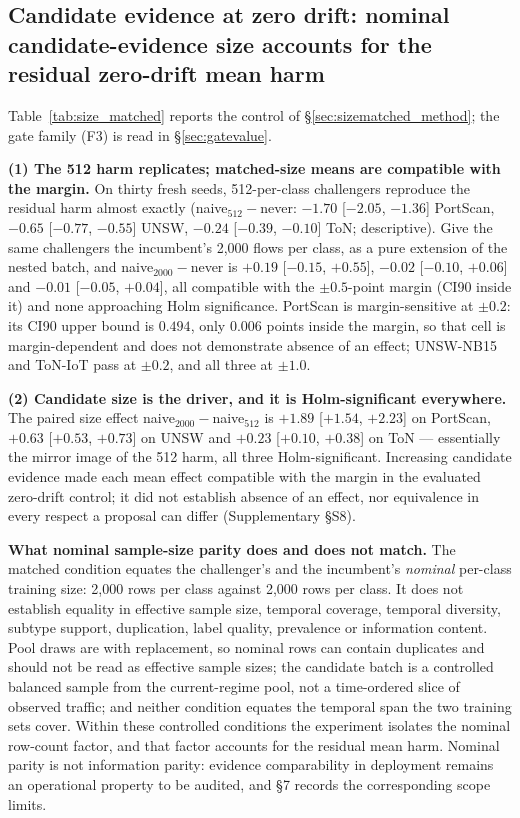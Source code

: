 \documentclass[journal]{IEEEtran}
\begin{document}
\subsection{Candidate evidence at zero drift: nominal candidate-evidence size accounts for the residual zero-drift mean harm}
\label{sec:sizematched}

Table~\ref{tab:size_matched} reports the control of \S\ref{sec:sizematched_method}; the gate family (F3) is read in \S\ref{sec:gatevalue}.

\textbf{(1) The 512 harm replicates; matched-size means are compatible with the margin.} On thirty fresh seeds, 512-per-class challengers reproduce the residual harm almost exactly (naive$_{512}-$never: $-1.70$ [$-2.05$, $-1.36$] PortScan, $-0.65$ [$-0.77$, $-0.55$] UNSW, $-0.24$ [$-0.39$, $-0.10$] ToN; descriptive). Give the same challengers the incumbent's 2{,}000 flows per class, as a pure extension of the nested batch, and naive$_{2000}-$never is $+0.19$ [$-0.15$, $+0.55$], $-0.02$ [$-0.10$, $+0.06$] and $-0.01$ [$-0.05$, $+0.04$], all compatible with the $\pm0.5$-point margin (CI90 inside it) and none approaching Holm significance. PortScan is margin-sensitive at $\pm0.2$: its CI90 upper bound is $0.494$, only $0.006$ points inside the margin, so that cell is margin-dependent and does not demonstrate absence of an effect; UNSW-NB15 and ToN-IoT pass at $\pm0.2$, and all three at $\pm1.0$.


\textbf{(2) Candidate size is the driver, and it is Holm-significant everywhere.} The paired size effect naive$_{2000}-$naive$_{512}$ is $+1.89$ [$+1.54$, $+2.23$] on PortScan, $+0.63$ [$+0.53$, $+0.73$] on UNSW and $+0.23$ [$+0.10$, $+0.38$] on ToN --- essentially the mirror image of the 512 harm, all three Holm-significant. Increasing candidate evidence made each mean effect compatible with the margin in the evaluated zero-drift control; it did not establish absence of an effect, nor equivalence in every respect a proposal can differ (Supplementary \S S8).

\textbf{What nominal sample-size parity does and does not match.} The matched condition equates the challenger's and the incumbent's \emph{nominal} per-class training size: 2{,}000 rows per class against 2{,}000 rows per class. It does not establish equality in effective sample size, temporal coverage, temporal diversity, subtype support, duplication, label quality, prevalence or information content. Pool draws are with replacement, so nominal rows can contain duplicates and should not be read as effective sample sizes; the candidate batch is a controlled balanced sample from the current-regime pool, not a time-ordered slice of observed traffic; and neither condition equates the temporal span the two training sets cover. Within these controlled conditions the experiment isolates the nominal row-count factor, and that factor accounts for the residual mean harm. Nominal parity is not information parity: evidence comparability in deployment remains an operational property to be audited, and \S7 records the corresponding scope limits.
\end{document}
